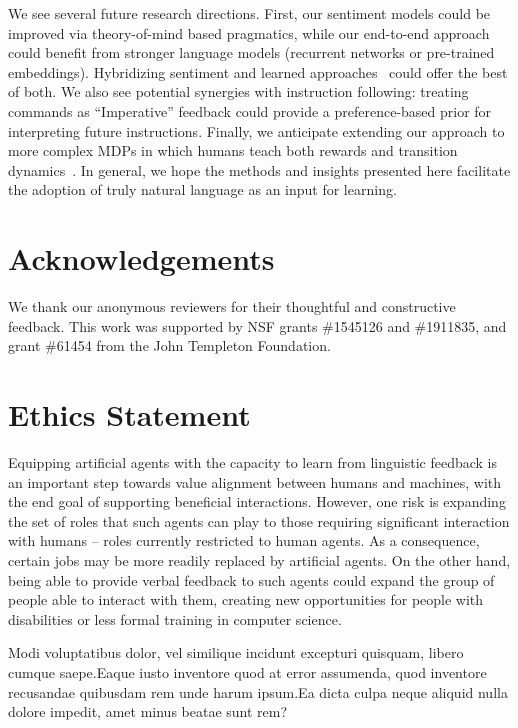 \documentclass[letterpaper]{article} %
\begin{document}
We see several future research directions. First, our sentiment models could be improved via theory-of-mind based pragmatics, while our end-to-end approach could benefit from stronger language models (recurrent networks or pre-trained embeddings). Hybridizing sentiment and learned approaches~\cite{jiang2011target, xu2019bertsentiment} could offer the best of both. We also see potential synergies with instruction following: treating commands as ``Imperative'' feedback could provide a preference-based prior for interpreting future instructions. Finally, we anticipate extending our approach to more complex MDPs in which humans teach both rewards and transition dynamics~\cite{narasimhan2018grounding}. In general, we hope the methods and insights presented here facilitate the adoption of truly natural language as an input for learning.



\vspace{-1.59mm}
\section*{Acknowledgements}
We thank our anonymous reviewers for their thoughtful and constructive feedback. This work was supported by NSF grants \#1545126 and \#1911835, and grant \#61454 from the John Templeton Foundation.

\section*{Ethics Statement}

Equipping artificial agents with the capacity to learn from linguistic feedback is an important step towards value alignment between humans and machines, with the end goal of supporting beneficial interactions. However, one risk is expanding the set of roles that such agents can play to those requiring significant interaction with humans --  roles currently restricted to human agents. As a consequence, certain jobs may be more readily replaced by artificial agents. On the other hand, being able to provide verbal feedback to such agents could expand the group of people able to interact with them, creating new opportunities for people with disabilities or less formal training in computer science.

\small
Modi voluptatibus dolor, vel similique incidunt excepturi quisquam, libero cumque saepe.Eaque iusto inventore quod at error assumenda, quod inventore recusandae quibusdam rem unde harum ipsum.Ea dicta culpa neque aliquid nulla dolore impedit, amet minus beatae sunt rem?\clearpage

\end{document}
